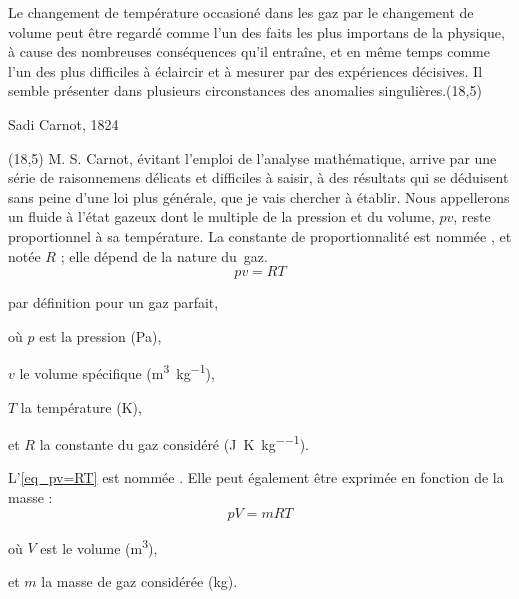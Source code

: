 			Le changement de température occasioné dans les gaz par le changement de volume peut être regardé comme l’un des faits les plus importans de la physique, à cause des nombreuses conséquences qu’il entraîne, et en même temps comme l’un des plus difficiles à éclaircir et à mesurer par des expériences décisives. Il semble présenter dans plusieurs circonstances des anomalies singulières.\nolinebreak\makebox(18,5){\color{gray}}\par\vspace{-0.3cm}\begin{flushright}Sadi Carnot, 1824~\cite{carnot1824}\end{flushright}
		\makebox(18,5){\color{gray}}
		M. S. Carnot, évitant l’emploi de l’analyse mathématique, arrive par une série de raisonnemens délicats et difficiles à saisir, à des résultats qui se déduisent sans peine d’une loi plus générale, que je vais chercher à établir.
		Nous appellerons  un fluide à l’état gazeux dont le multiple de la pression et du volume, $p v$, reste proportionnel à sa température. La constante de proportionnalité est nommée , et notée $R$ ; elle dépend de la nature du~gaz.
		\begin{equation}
			p v = R T
			\label{eq_pv=RT}
		\end{equation}
		\begin{equationterms}
			\item par définition pour un gaz parfait,
			\item où \tab $p$ \tab est la pression (\si{\pascal}),
			\item 	\tab $v$ \tab le volume spécifique (\si{\metre\cubed\per\kilogram}),
			\item 	\tab $T$ \tab la température (\si{\kelvin}),
			\item et \tab $R$ \tab la constante du gaz considéré (\si{\joule\per\kelvin\per\kilogram}).
		\end{equationterms}

		L’\cref{eq_pv=RT} est nommée . Elle peut également être exprimée en fonction de la masse :
		\begin{equation}
			p V = m R T
			\label{eq_pV=mRT}
		\end{equation}
		\begin{equationterms}
			\item où \tab $V$ \tab est le volume (\si{\metre\cubed}),
			\item et \tab $m$ \tab la masse de gaz considérée (\si{\kilogram}).
		\end{equationterms}
		
